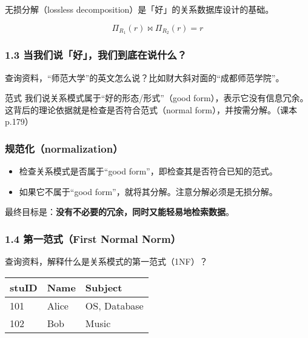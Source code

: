 \documentclass[aspectratio=169, 14pt]{beamer}
\begin{document}
{
\begin{frame}[standout]
    无损分解（lossless decomposition）是「好」的关系数据库设计的基础。
    
    \[\Pi_{R_1}(r) \Join  \Pi_{R_2}(r) = r\]
\end{frame}
}

\begin{frame}
    \frametitle{1.3 当我们说「好」，我们到底在说什么？}

 查询资料，“师范大学”的英文怎么说？比如财大斜对面的“成都师范学院”。

\pause
\begin{exampleblock}{范式}
    我们说关系模式属于“好的形态/形式”（good form），表示它\alert{没有信息冗余}。这背后的理论依据就是检查是否符合\alert{范式}（normal form），并按需\alert{分解}。（课本p.179）    
\end{exampleblock}
\end{frame}

\begin{frame}
    \frametitle{规范化（normalization）}

    \begin{itemize}
        \item 检查关系模式是否属于“good form”，即检查其是否符合已知的范式。
        \item 如果它不属于“good form”，就将其分解。注意分解必须是无损分解。
    \end{itemize}

     最终目标是：\textbf{没有不必要的冗余，同时又能轻易地检索数据}。
\end{frame}

\begin{frame}
    \frametitle{1.4 第一范式（First Normal Norm）}

    查询资料，解释什么是关系模式的\alert{第一范式}（1NF）？

    \begin{table}
        \begin{tabular}{lll}
          \toprule
          stuID & Name & Subject \\
          \midrule
          101 & Alice & OS, Database \\
          102 & Bob & Music \\
          \bottomrule
        \end{tabular}
    \end{table}

    
\end{frame}
\end{document}
